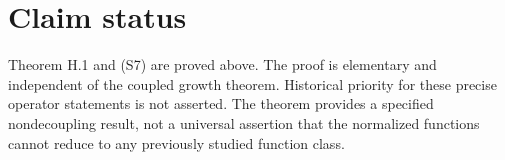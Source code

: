 \hypertarget{v11-coupled_structure_full-claim-status}{%
\section{Claim status}\label{v11-coupled_structure_full-claim-status}}

Theorem H.1 and (S7) are proved above. The proof is elementary and
independent of the coupled growth theorem. Historical priority for these
precise operator statements is not asserted. The theorem provides a
specified nondecoupling result, not a universal assertion that the
normalized functions cannot reduce to any previously studied function
class.
